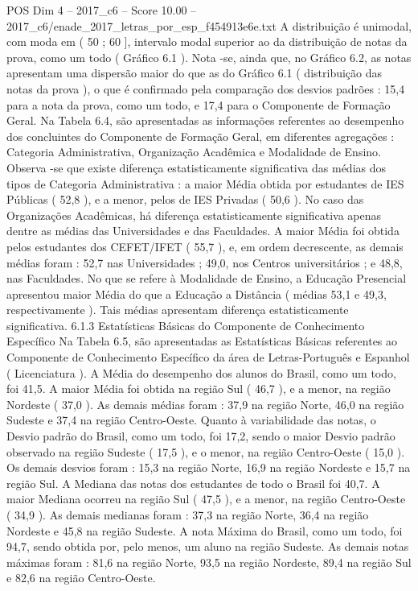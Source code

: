 \begin{textsample}{POS Dim 4 – 2017\_c6 – Score 10.00 – 2017\_c6/enade\_2017\_letras\_por\_esp\_f454913e6e.txt}
A distribuição é unimodal, com moda em ( 50 ; 60 ], intervalo modal superior ao da distribuição de notas da prova, como um todo ( Gráfico 6.1 ).
Nota -se, ainda que, no Gráfico 6.2, as notas apresentam uma dispersão maior do que as do Gráfico 6.1 ( distribuição das notas da prova ), o que é confirmado pela comparação dos desvios padrões : 15,4 para a nota da prova, como um todo, e 17,4 para o Componente de Formação Geral.
Na Tabela 6.4, são apresentadas as informações referentes ao desempenho dos concluintes do Componente de Formação Geral, em diferentes agregações : Categoria Administrativa, Organização Acadêmica e Modalidade de Ensino.
Observa -se que existe diferença estatisticamente significativa das médias dos tipos de Categoria Administrativa : a maior Média obtida por estudantes de IES Públicas ( 52,8 ), e a menor, pelos de IES Privadas ( 50,6 ).
No caso das Organizações Acadêmicas, há diferença estatisticamente significativa apenas dentre as médias das Universidades e das Faculdades.
A maior Média foi obtida pelos estudantes dos CEFET/IFET ( 55,7 ), e, em ordem decrescente, as demais médias foram : 52,7 nas Universidades ; 49,0, nos Centros universitários ; e 48,8, nas Faculdades.
No que se refere à Modalidade de Ensino, a Educação Presencial apresentou maior Média do que a Educação a Distância ( médias 53,1 e 49,3, respectivamente ).
Tais médias apresentam diferença estatisticamente significativa. 6.1.3 Estatísticas Básicas do Componente de Conhecimento Específico Na Tabela 6.5, são apresentadas as Estatísticas Básicas referentes ao Componente de Conhecimento Específico da área de Letras-Português e Espanhol ( Licenciatura ).
A Média do desempenho dos alunos do Brasil, como um todo, foi 41,5.
A maior Média foi obtida na região Sul ( 46,7 ), e a menor, na região Nordeste ( 37,0 ).
As demais médias foram : 37,9 na região Norte, 46,0 na região Sudeste e 37,4 na região Centro-Oeste.
Quanto à variabilidade das notas, o Desvio padrão do Brasil, como um todo, foi 17,2, sendo o maior Desvio padrão observado na região Sudeste ( 17,5 ), e o menor, na região Centro-Oeste ( 15,0 ).
Os demais desvios foram : 15,3 na região Norte, 16,9 na região Nordeste e 15,7 na região Sul.
A Mediana das notas dos estudantes de todo o Brasil foi 40,7.
A maior Mediana ocorreu na região Sul ( 47,5 ), e a menor, na região Centro-Oeste ( 34,9 ).
As demais medianas foram : 37,3 na região Norte, 36,4 na região Nordeste e 45,8 na região Sudeste.
A nota Máxima do Brasil, como um todo, foi 94,7, sendo obtida por, pelo menos, um aluno na região Sudeste.
As demais notas máximas foram : 81,6 na região Norte, 93,5 na região Nordeste, 89,4 na região Sul e 82,6 na região Centro-Oeste.

\end{textsample}
